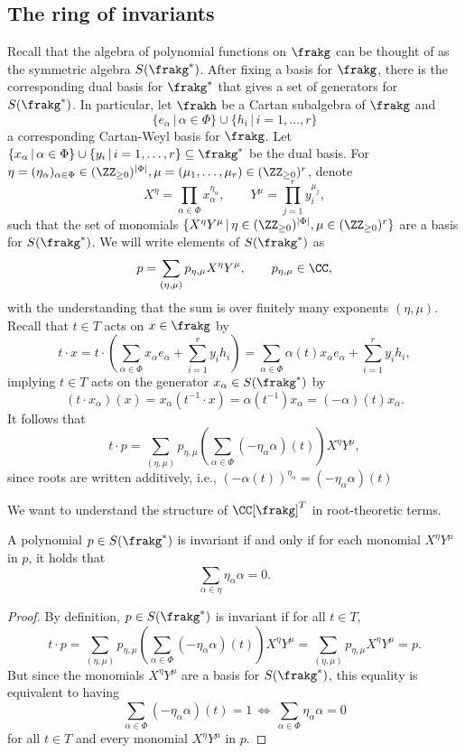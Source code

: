 \subsection{The ring of invariants}
Recall that the algebra of polynomial functions on $\frakg$ can be thought of as the symmetric algebra $S(\frakg^*)$.
After fixing a basis for $\frakg$, there is the corresponding dual basis for $\frakg^*$ that gives a set of generators for $S(\frakg^*)$.
In particular, let $\frakh$ be a Cartan subalgebra of $\frakg$ and 
$$\{e_\alpha \, | \, \alpha \in \Phi\}\cup\{h_i \, | \, i=1,\ldots, r\}$$
a corresponding Cartan-Weyl basis for $\frakg$.
Let $\{x_\alpha\,|\,\alpha\in\Phi\}\cup\{y_i\,|\,i=1,\ldots,r\}\subseteq\frakg^*$ be the dual basis.
For $\eta = (\eta_\alpha)_{\alpha\in\Phi} \in (\ZZ_{\ge0})^{|\Phi|}, \mu = (\mu_1, \ldots, \mu_r)\in (\ZZ_{\ge0})^r$, denote
$$X^\eta = \prod_{\alpha\in\Phi} x_{\alpha}^{\eta_\alpha}, \qquad Y^\mu = \prod_{j=1}^r y_i^{\mu_j},$$
such that the set of monomials $\{X^\eta Y^\mu\,|\,\eta \in (\ZZ_{\ge0})^{|\Phi|}, \mu\in(\ZZ_{\ge0})^r\}$ are a basis for $S(\frakg^*)$.
We will write elements of $S(\frakg^*)$ as 
$$p = \sum_{(\eta, \mu)} p_{\eta,\mu} X^\eta Y^\mu, \qquad p_{\eta,\mu} \in \CC,$$
with the understanding that the sum is over finitely many exponents $(\eta, \mu)$.
Recall that $t \in T$ acts on $x \in \frakg$ by
$$t \cdot x = t \cdot \left(\sum_{\alpha\in\Phi} x_\alpha e_\alpha + \sum_{i=1}^r y_i h_i \right) = \sum_{\alpha\in\Phi} \alpha(t) x_\alpha e_\alpha + \sum_{i=1}^r y_i h_i,$$
implying $t \in T$ acts on the generator $x_\alpha \in S(\frakg^*)$ by
$$(t\cdot x_\alpha)(x) = x_\alpha(t^{-1} \cdot x) = \alpha(t^{-1}) x_\alpha = (-\alpha)(t) x_\alpha.$$
It follows that 
$$t \cdot p = \sum_{(\eta, \mu)} p_{\eta,\mu} \left(\sum_{\alpha\in\Phi} (- \eta_\alpha \alpha)(t)\right) X^\eta Y^\mu,$$
since roots are written additively, i.e., $(-\alpha(t))^{\eta_\alpha} = (-\eta_\alpha \alpha)(t)$

We want to understand the structure of $\CC[\frakg]^T$ in root-theoretic terms.
\begin{lemma}
A polynomial $p \in S(\frakg^*)$ is invariant if and only if for each monomial $X^\eta Y^\mu$ in $p$, it holds that
$$\sum_{\alpha\in\eta} \eta_\alpha \alpha = 0.$$
\end{lemma}
\begin{proof}
    By definition, $p \in S(\frakg^*)$ is invariant if for all $t \in T$,
    $$t\cdot p = \sum_{(\eta, \mu)} p_{\eta,\mu} \left(\sum_{\alpha\in\Phi} (- \eta_\alpha \alpha)(t)\right) X^\eta Y^\mu = \sum_{(\eta, \mu)} p_{\eta,\mu} X^\eta Y^\mu=p.$$
    But since the monomials $X^\eta Y^\mu$ are a basis for $S(\frakg^*)$, this equality is equivalent to having 
    $$\sum_{\alpha\in\Phi} (- \eta_\alpha \alpha)(t) = 1 \, \iff \, \sum_{\alpha\in\Phi} \eta_\alpha \alpha = 0$$
    for all $t \in T$ and every monomial $X^\eta Y^\mu$ in $p$.
\end{proof}

